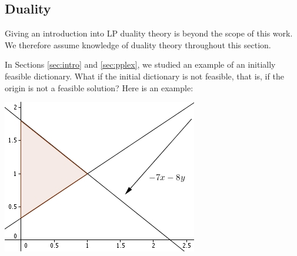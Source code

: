 \documentclass[ukenglish]{nik}
\begin{document}
\subsection{Duality}

Giving an introduction into LP duality theory is beyond the scope of this work. We therefore assume knowledge of duality theory throughout this section.

In Sections \ref{sec:intro} and \ref{sec:pplex}, we studied an example of an initially feasible dictionary.
What if the initial dictionary is not feasible, that is, if the origin is not a
feasible solution? Here is an example:

\begin{minipage}{.45\textwidth}
\begin{alltt}

\end{alltt}
\end{minipage}
\begin{minipage}{.45\textwidth}
	\includegraphics{ex_dual.jpg}
\end{minipage}
\vspace{.2cm}
\end{document}

